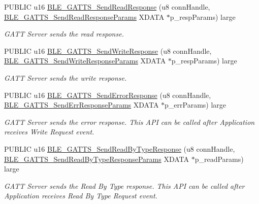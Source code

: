 \begin{DoxyCompactItemize}
P\+U\+B\+L\+IC u16 \hyperlink{group___b_l_e___g_a_t_t_ga22e55f1a3ce94f17f644be2a3241aa10}{B\+L\+E\+\_\+\+G\+A\+T\+T\+S\+\_\+\+Send\+Read\+Response} (u8 conn\+Handle, \hyperlink{struct_b_l_e___g_a_t_t_s___send_read_response_params}{B\+L\+E\+\_\+\+G\+A\+T\+T\+S\+\_\+\+Send\+Read\+Response\+Params} X\+D\+A\+TA $\ast$p\+\_\+resp\+Params) large
\begin{DoxyCompactList}\small\item\em G\+A\+TT Server sends the read response. \end{DoxyCompactList}\item 
P\+U\+B\+L\+IC u16 \hyperlink{group___b_l_e___g_a_t_t_ga94dbe55f4f14f255bde6d3273b14b282}{B\+L\+E\+\_\+\+G\+A\+T\+T\+S\+\_\+\+Send\+Write\+Response} (u8 conn\+Handle, \hyperlink{struct_b_l_e___g_a_t_t_s___send_write_response_params}{B\+L\+E\+\_\+\+G\+A\+T\+T\+S\+\_\+\+Send\+Write\+Response\+Params} X\+D\+A\+TA $\ast$p\+\_\+resp\+Params) large
\begin{DoxyCompactList}\small\item\em G\+A\+TT Server sends the write response. \end{DoxyCompactList}\item 
P\+U\+B\+L\+IC u16 \hyperlink{group___b_l_e___g_a_t_t_gaf0554a04e9e8b1c983f67120d56ddb3f}{B\+L\+E\+\_\+\+G\+A\+T\+T\+S\+\_\+\+Send\+Error\+Response} (u8 conn\+Handle, \hyperlink{struct_b_l_e___g_a_t_t_s___send_err_response_params}{B\+L\+E\+\_\+\+G\+A\+T\+T\+S\+\_\+\+Send\+Err\+Response\+Params} X\+D\+A\+TA $\ast$p\+\_\+err\+Params) large
\begin{DoxyCompactList}\small\item\em G\+A\+TT Server sends the error response. This A\+PI can be called after Application receives Write Request event. \end{DoxyCompactList}\item 
P\+U\+B\+L\+IC u16 \hyperlink{group___b_l_e___g_a_t_t_gaaa6ea10aeb9c2dd491e8de7f7432aef6}{B\+L\+E\+\_\+\+G\+A\+T\+T\+S\+\_\+\+Send\+Read\+By\+Type\+Response} (u8 conn\+Handle, \hyperlink{struct_b_l_e___g_a_t_t_s___send_read_by_type_response_params}{B\+L\+E\+\_\+\+G\+A\+T\+T\+S\+\_\+\+Send\+Read\+By\+Type\+Response\+Params} X\+D\+A\+TA $\ast$p\+\_\+read\+Params) large
\begin{DoxyCompactList}\small\item\em G\+A\+TT Server sends the Read By Type response. This A\+PI can be called after Application receives Read By Type Request event. \end{DoxyCompactList}\end{DoxyCompactItemize}


